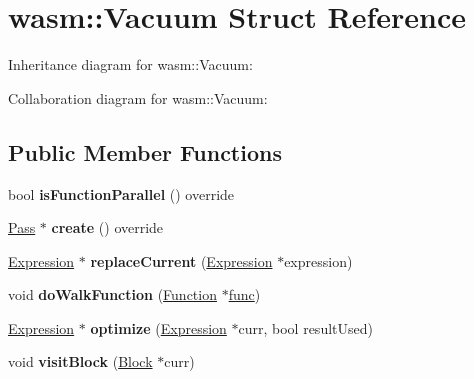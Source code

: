 \hypertarget{structwasm_1_1_vacuum}{}\section{wasm\+:\+:Vacuum Struct Reference}
\label{structwasm_1_1_vacuum}


Inheritance diagram for wasm\+:\+:Vacuum\+:


Collaboration diagram for wasm\+:\+:Vacuum\+:
\subsection*{Public Member Functions}
\begin{DoxyCompactItemize}
\item 
\mbox{\label{structwasm_1_1_vacuum_a231f477d2f1c44e243f5835e468be56c}} 
bool {\bfseries is\+Function\+Parallel} () override
\item 
\mbox{\label{structwasm_1_1_vacuum_ad4155fe9e50dfec9b463ff5227251fbe}} 
\mbox{\hyperlink{classwasm_1_1_pass}{Pass}} $\ast$ {\bfseries create} () override
\item 
\mbox{\label{structwasm_1_1_vacuum_a849c533f8e4f0ea60fc09ee3c121977b}} 
\mbox{\hyperlink{classwasm_1_1_expression}{Expression}} $\ast$ {\bfseries replace\+Current} (\mbox{\hyperlink{classwasm_1_1_expression}{Expression}} $\ast$expression)
\item 
\mbox{\label{structwasm_1_1_vacuum_a6f6d8a7faa3a9257baa67c8c7dd38a9f}} 
void {\bfseries do\+Walk\+Function} (\mbox{\hyperlink{classwasm_1_1_function}{Function}} $\ast$\mbox{\hyperlink{structfunc}{func}})
\item 
\mbox{\label{structwasm_1_1_vacuum_ac49f4000e3e6a5e812918bfbee839d2e}} 
\mbox{\hyperlink{classwasm_1_1_expression}{Expression}} $\ast$ {\bfseries optimize} (\mbox{\hyperlink{classwasm_1_1_expression}{Expression}} $\ast$curr, bool result\+Used)
\item 
\mbox{\label{structwasm_1_1_vacuum_adbd5c8013697c1aff745cfe2da56b015}} 
void {\bfseries visit\+Block} (\mbox{\hyperlink{classwasm_1_1_block}{Block}} $\ast$curr)
\item 

\end{DoxyCompactItemize}
